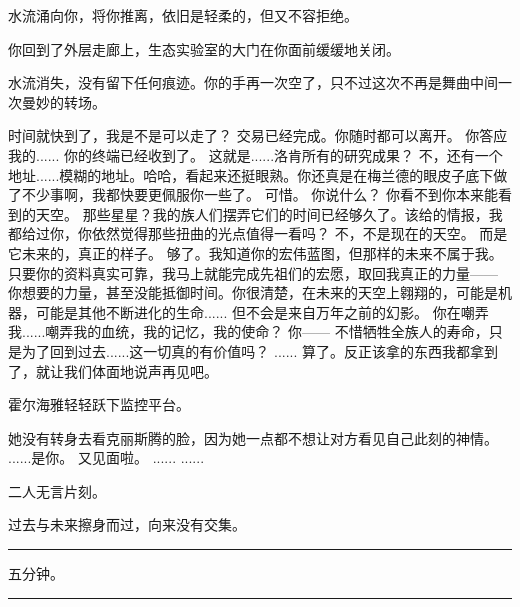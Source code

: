 \documentclass[openany]{book}
\begin{document}
水流涌向你，将你推离，依旧是轻柔的，但又不容拒绝。\par
你回到了外层走廊上，生态实验室的大门在你面前缓缓地关闭。\par
水流消失，没有留下任何痕迹。你的手再一次空了，只不过这次不再是舞曲中间一次曼妙的转场。

\begin{dialogue}
     时间就快到了，我是不是可以走了？
     交易已经完成。你随时都可以离开。
     你答应我的......
     你的终端已经收到了。
     这就是......洛肯所有的研究成果？
     不，还有一个地址......模糊的地址。哈哈，看起来还挺眼熟。你还真是在梅兰德的眼皮子底下做了不少事啊，我都快要更佩服你一些了。
     可惜。
     你说什么？
     你看不到你本来能看到的天空。
     那些星星？我的族人们摆弄它们的时间已经够久了。该给的情报，我都给过你，你依然觉得那些扭曲的光点值得一看吗？
     不，不是现在的天空。
     而是它未来的，真正的样子。
     够了。我知道你的宏伟蓝图，但那样的未来不属于我。只要你的资料真实可靠，我马上就能完成先祖们的宏愿，取回我真正的力量——
     你想要的力量，甚至没能抵御时间。你很清楚，在未来的天空上翱翔的，可能是机器，可能是其他不断进化的生命......
     但不会是来自万年之前的幻影。
     你在嘲弄我......嘲弄我的血统，我的记忆，我的使命？
     你——
     不惜牺牲全族人的寿命，只是为了回到过去......这一切真的有价值吗？
     ......
     算了。反正该拿的东西我都拿到了，就让我们体面地说声再见吧。\par
    霍尔海雅轻轻跃下监控平台。\par
    她没有转身去看克丽斯腾的脸，因为她一点都不想让对方看见自己此刻的神情。
     ......是你。
     又见面啦。
     ......
     ......
\end{dialogue}
\par
二人无言片刻。\par
过去与未来擦身而过，向来没有交集。
\par\noindent\rule{\textwidth}{0.4pt}
五分钟。
\par\noindent\rule{\textwidth}{0.4pt}
\end{document}
